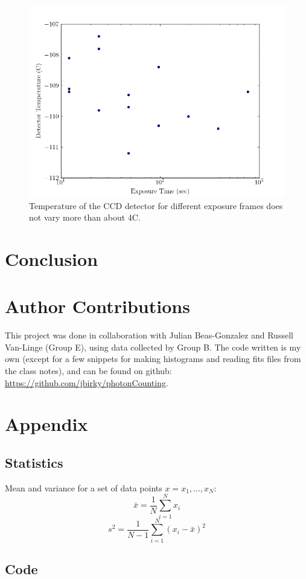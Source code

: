 \documentclass[preprint]{aastex62}
\begin{document}
\begin{figure}[ht]
\begin{center}
\includegraphics[width=.48\linewidth]{plots/exposure_temp.png}
\caption{Temperature of the CCD detector for different exposure frames does not vary more than about 4C.}
\end{center}
\end{figure}

\section{Conclusion}

\section{Author Contributions}

This project was done in collaboration with Julian Beas-Gonzalez and Russell Van-Linge (Group E), using data collected by Group B. The code written is my own (except for a few snippets for making histograms and reading fits files from the class notes), and can be found on github: \href{https://github.com/jbirky/photonCounting}{https://github.com/jbirky/photonCounting}.

\section{Appendix}

\subsection{Statistics}
Mean and variance for a set of data points $x={x_1, ...,x_N}$:
\begin{equation}
	\bar{x} = \frac{1}{N} \sum^N_{i=1} x_i  
\end{equation}
\begin{equation}
	s^2 = \frac{1}{N-1} \sum^N_{i=1} (x_i - \bar{x})^2
\end{equation}

\subsection{Code}


\end{document}
